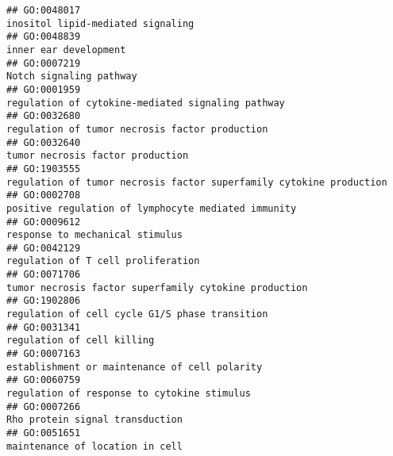 \documentclass[
]{article}
\begin{document}
\begin{verbatim}
## GO:0048017                                                                                                                inositol lipid-mediated signaling
## GO:0048839                                                                                                                            inner ear development
## GO:0007219                                                                                                                          Notch signaling pathway
## GO:0001959                                                                                                regulation of cytokine-mediated signaling pathway
## GO:0032680                                                                                                   regulation of tumor necrosis factor production
## GO:0032640                                                                                                                 tumor necrosis factor production
## GO:1903555                                                                              regulation of tumor necrosis factor superfamily cytokine production
## GO:0002708                                                                                              positive regulation of lymphocyte mediated immunity
## GO:0009612                                                                                                                  response to mechanical stimulus
## GO:0042129                                                                                                               regulation of T cell proliferation
## GO:0071706                                                                                            tumor necrosis factor superfamily cytokine production
## GO:1902806                                                                                                   regulation of cell cycle G1/S phase transition
## GO:0031341                                                                                                                       regulation of cell killing
## GO:0007163                                                                                                    establishment or maintenance of cell polarity
## GO:0060759                                                                                                      regulation of response to cytokine stimulus
## GO:0007266                                                                                                                  Rho protein signal transduction
## GO:0051651                                                                                                                  maintenance of location in cell

\end{verbatim}
\end{document}
